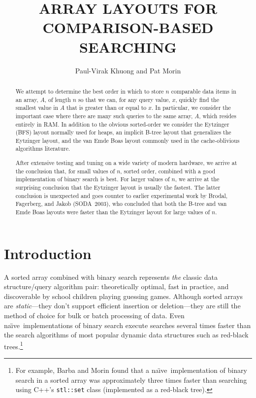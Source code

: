 \documentclass{patmorin}
\title{\MakeUppercase{Array Layouts for Comparison-Based Searching}}
\author{Paul-Virak Khuong and Pat Morin}
\newcommand{\naive}{na\"{\i}ve}
\begin{document}
\begin{titlepage}
\maketitle


\begin{abstract}
  We attempt to determine the best order in which to store $n$ comparable
  data items in an array, $A$, of length $n$ so that we can, for any query
  value, $x$, quickly find the smallest value in $A$ that is greater
  than or equal to $x$. In particular, we consider the important case
  where there are many such queries to the same array, $A$, which resides
  entirely in RAM.  In addition to the obvious sorted-order we consider
  the Eytzinger (BFS) layout normally used for heaps, an implicit B-tree
  layout that generalizes the Eytzinger layout, and the van Emde Boas
  layout commonly used in the cache-oblivious algorithms literature.

  After extensive testing and tuning on a wide variety of modern hardware,
  we arrive at the conclusion that, for small values of $n$, sorted
  order, combined with a good implementation of binary search is best.
  For larger values of $n$, we arrive at the surprising conclusion that
  the Eytzinger layout is usually the fastest.  The latter conclusion is
  unexpected and goes counter to earlier experimental work by Brodal,
  Fagerberg, and Jakob (SODA~2003), who concluded that both the B-tree
  and van Emde Boas layouts were faster than the Eytzinger layout for
  large values of $n$.
\end{abstract}

\end{titlepage}

\tableofcontents
\newpage

\section{Introduction}

A sorted array combined with binary search represents \emph{the} classic
data structure/query algorithm pair: theoretically optimal, fast in
practice, and discoverable by school children playing guessing games.
Although sorted arrays are \emph{static}---they don't support efficient
insertion or deletion---they are still the method of choice for bulk or
batch processing of data. Even \naive\ implementations of binary search
execute searches several times faster than the search algorithms of most
popular dynamic data structures such as red-black trees.\footnote{For
example, Barba and Morin \cite{barba.morin:top-down} found that a \naive\
implementation of binary search in a sorted array was approximately
three times faster than searching using C++'s \texttt{stl::set} class
(implemented as a red-black tree).}
\end{document}
